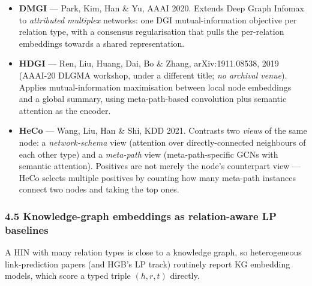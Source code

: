 \begin{itemize}\itemsep3pt
\item \textbf{DMGI} --- Park, Kim, Han \& Yu, AAAI 2020. Extends Deep Graph Infomax to
  \emph{attributed multiplex} networks: one DGI mutual-information objective per relation type,
  with a consensus regularisation that pulls the per-relation embeddings towards a shared
  representation.
\item \textbf{HDGI} --- Ren, Liu, Huang, Dai, Bo \& Zhang, arXiv:1911.08538, 2019 (AAAI-20 DLGMA
  workshop, under a different title; \emph{no archival venue}). Applies mutual-information
  maximisation between local node embeddings and a global summary, using meta-path-based
  convolution plus semantic attention as the encoder.
\item \textbf{HeCo} --- Wang, Liu, Han \& Shi, KDD 2021. Contrasts two \emph{views} of the same
  node: a \emph{network-schema} view (attention over directly-connected neighbours of each other
  type) and a \emph{meta-path} view (meta-path-specific GCNs with semantic attention). Positives
  are not merely the node's counterpart view --- HeCo selects multiple positives by counting how
  many meta-path instances connect two nodes and taking the top ones.
\end{itemize}

\subsubsection*{4.5 Knowledge-graph embeddings as relation-aware LP baselines}

A HIN with many relation types is close to a knowledge graph, so heterogeneous link-prediction
papers (and HGB's LP track) routinely report KG embedding models, which score a typed triple
$(h,r,t)$ directly.

